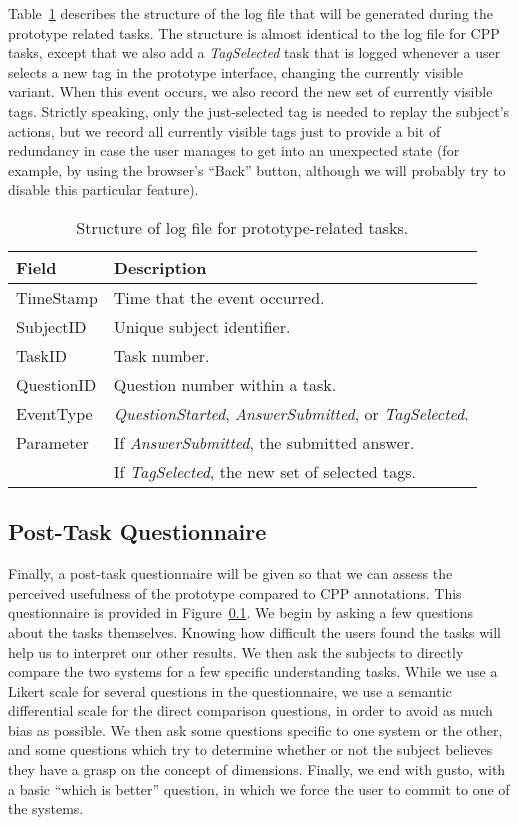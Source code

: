 \documentclass[11pt]{article}
\newcommand{\event}[1]{\textit{#1}}
\begin{document}
	Table~\ref{tbl:protolog} describes the structure of the log file that will be
	generated during the prototype related tasks.  The structure is almost
	identical to the log file for CPP tasks, except that we also add a
	\event{TagSelected} task that is logged whenever a user selects a new tag in
	the prototype interface, changing the currently visible variant.  When this
	event occurs, we also record the new set of currently visible tags.  Strictly
	speaking, only the just-selected tag is needed to replay the subject's actions,
	but we record all currently visible tags just to provide a bit of redundancy in
	case the user manages to get into an unexpected state (for example, by using
	the browser's ``Back'' button, although we will probably try to disable this
	particular feature).
	
	\begin{table}
		\centering
		\begin{tabular}{|l | p{}|}
			\hline
			\textbf{Field} & \textbf{Description} \\
			\hline
			TimeStamp  & Time that the event occurred. \\
			SubjectID  & Unique subject identifier. \\
			TaskID     & Task number. \\
			QuestionID & Question number within a task. \\
			EventType  & \event{QuestionStarted}, \event{AnswerSubmitted},
			or \event{TagSelected}. \\
			Parameter  & If \event{AnswerSubmitted}, the submitted answer. \\
			& If \event{TagSelected}, the new set of selected tags. \\
			\hline
		\end{tabular}
		\caption{Structure of log file for prototype-related tasks.}
		\label{tbl:protolog}
	\end{table}
	
	\subsection{Post-Task Questionnaire}
	\label{sec:post}
	
	Finally, a post-task questionnaire will be given so that we can assess the
	perceived usefulness of the prototype compared to CPP annotations.  This
	questionnaire is provided in Figure~\ref{sec:post}.
	We begin by asking a few questions about the tasks themselves.  Knowing how
	difficult the users found the tasks will help us to interpret our other
	results.  We then ask the subjects to directly compare the two systems for a
	few specific understanding tasks. 
	While we use a Likert scale for several questions in the questionnaire, we use
	a semantic differential scale for the direct comparison questions, in order to
	avoid as much bias as possible.  We then ask some questions specific to one
	system or the other, and some questions which try to determine whether or not
	the subject believes they have a grasp on the concept of dimensions.  Finally,
	we end with gusto, with a basic ``which is better'' question, in which we force
	the user to commit to one of the systems. 
	
\end{document}
